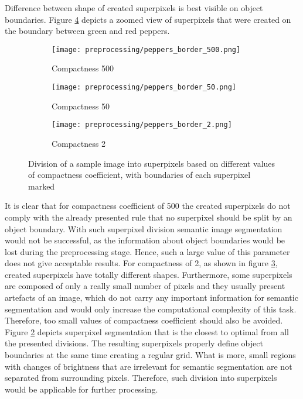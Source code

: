 Difference between shape of created superpixels is best visible on object boundaries. Figure \ref{fig:peppers_boundaries_zoom} depicts a zoomed view of superpixels that were created on the boundary between green and red peppers.
\begin{figure}[h]
 \centering
  \begin{subfigure}[h]{0.32\textwidth}
    \texttt{[image: preprocessing/peppers\_border\_500.png]}
    \caption{Compactness 500}
    \label{fig:peppers_boundaries_zoom_500}
  \end{subfigure}
  \begin{subfigure}[h]{0.32\textwidth}
    \texttt{[image: preprocessing/peppers\_border\_50.png]}
    \caption{Compactness 50}
    \label{fig:peppers_boundaries_zoom_50}
  \end{subfigure}
    \begin{subfigure}[h]{0.32\textwidth}
    \texttt{[image: preprocessing/peppers\_border\_2.png]}
    \caption{Compactness 2}
    \label{fig:peppers_boundaries_zoom_2}
  \end{subfigure}
     \caption{Division of a sample image into superpixels based on different values of compactness coefficient, with boundaries of each superpixel marked}%
    \label{fig:peppers_boundaries_zoom} 
\end{figure}
It is clear that for compactness coefficient of 500 the created superpixels do not comply with the already presented rule that no superpixel should be split by an object boundary. With such superpixel division semantic image segmentation would not be successful, as the information about object boundaries would be lost during the preprocessing stage. Hence, such a large value of this parameter does not give acceptable results. For compactness of 2, as shown in figure \ref{fig:peppers_boundaries_zoom_2}, created superpixels have totally different shapes. Furthermore, some superpixels are composed of only a really small number of pixels and they usually present artefacts of an image, which do not carry any important information for semantic segmentation and would only increase the computational complexity of this task. Therefore, too small values of compactness coefficient should also be avoided. Figure \ref{fig:peppers_boundaries_zoom_50} depicts superpixel segmentation that is the closest to optimal from all the presented divisions. The resulting superpixels properly define object boundaries at the same time creating a regular grid. What is more, small regions with changes of brightness that are irrelevant for semantic segmentation are not separated from surrounding pixels. Therefore, such division into superpixels would be applicable for further processing.

